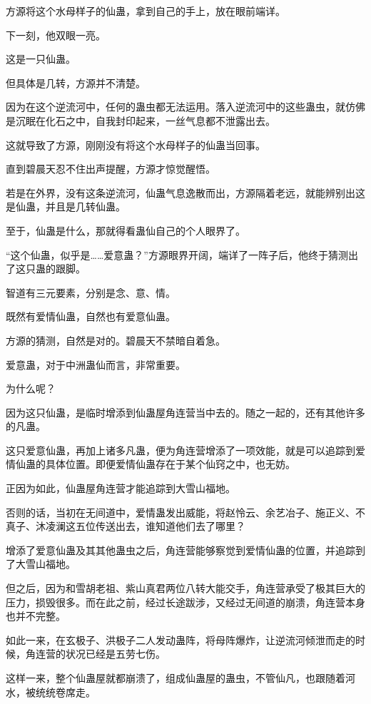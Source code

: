 
\begin{this_body}

方源将这个水母样子的仙蛊，拿到自己的手上，放在眼前端详。

下一刻，他双眼一亮。

这是一只仙蛊。

但具体是几转，方源并不清楚。

因为在这个逆流河中，任何的蛊虫都无法运用。落入逆流河中的这些蛊虫，就仿佛是沉眠在化石之中，自我封印起来，一丝气息都不泄露出去。

这就导致了方源，刚刚没有将这个水母样子的仙蛊当回事。

直到碧晨天忍不住出声提醒，方源才惊觉醒悟。

若是在外界，没有这条逆流河，仙蛊气息逸散而出，方源隔着老远，就能辨别出这是仙蛊，并且是几转仙蛊。

至于，仙蛊是什么，那就得看蛊仙自己的个人眼界了。

“这个仙蛊，似乎是……爱意蛊？”方源眼界开阔，端详了一阵子后，他终于猜测出了这只蛊的跟脚。

智道有三元要素，分别是念、意、情。

既然有爱情仙蛊，自然也有爱意仙蛊。

方源的猜测，自然是对的。碧晨天不禁暗自着急。

爱意蛊，对于中洲蛊仙而言，非常重要。

为什么呢？

因为这只仙蛊，是临时增添到仙蛊屋角连营当中去的。随之一起的，还有其他许多的凡蛊。

这只爱意仙蛊，再加上诸多凡蛊，便为角连营增添了一项效能，就是可以追踪到爱情仙蛊的具体位置。即便爱情仙蛊存在于某个仙窍之中，也无妨。

正因为如此，仙蛊屋角连营才能追踪到大雪山福地。

否则的话，当初在无间道中，爱情蛊发出威能，将赵怜云、余艺冶子、施正义、不真子、沐凌澜这五位传送出去，谁知道他们去了哪里？

增添了爱意仙蛊及其其他蛊虫之后，角连营能够察觉到爱情仙蛊的位置，并追踪到了大雪山福地。

但之后，因为和雪胡老祖、紫山真君两位八转大能交手，角连营承受了极其巨大的压力，损毁很多。而在此之前，经过长途跋涉，又经过无间道的崩溃，角连营本身也并不完整。

如此一来，在玄极子、洪极子二人发动蛊阵，将母阵爆炸，让逆流河倾泄而走的时候，角连营的状况已经是五劳七伤。

这样一来，整个仙蛊屋就都崩溃了，组成仙蛊屋的蛊虫，不管仙凡，也跟随着河水，被统统卷席走。


\end{this_body}
